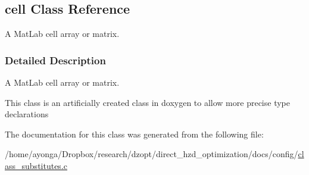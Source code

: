 \hypertarget{classcell}{}\subsection{cell Class Reference}
\label{classcell}


A Mat\+Lab cell array or matrix.  




\subsubsection{Detailed Description}
A Mat\+Lab cell array or matrix. 

This class is an artificially created class in doxygen to allow more precise type declarations 

The documentation for this class was generated from the following file\+:\begin{DoxyCompactItemize}
\item 
/home/ayonga/\+Dropbox/research/dzopt/direct\+\_\+hzd\+\_\+optimization/docs/config/\hyperlink{class__substitutes_8c}{class\+\_\+substitutes.\+c}\end{DoxyCompactItemize}

